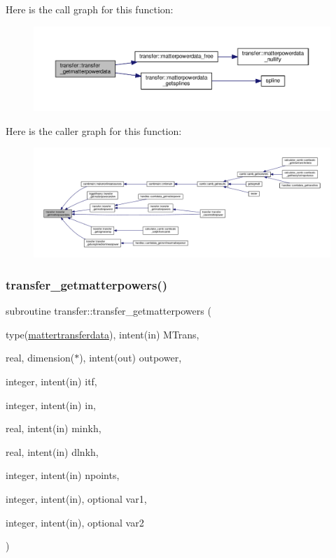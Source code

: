 Here is the call graph for this function\+:
\nopagebreak
\begin{figure}[H]
\begin{center}
\leavevmode
\includegraphics[width=350pt]{namespacetransfer_a149c7870c28cd849591073c3d8f76d69_cgraph}
\end{center}
\end{figure}
Here is the caller graph for this function\+:
\nopagebreak
\begin{figure}[H]
\begin{center}
\leavevmode
\includegraphics[width=350pt]{namespacetransfer_a149c7870c28cd849591073c3d8f76d69_icgraph}
\end{center}
\end{figure}
\mbox{\label{namespacetransfer_a4515b492b259544eae13a774663d6cea}} 
\subsubsection{\texorpdfstring{transfer\+\_\+getmatterpowers()}{transfer\_getmatterpowers()}}
{\footnotesize\ttfamily subroutine transfer\+::transfer\+\_\+getmatterpowers (\begin{DoxyParamCaption}\item[{type(\mbox{\hyperlink{structtransfer_1_1mattertransferdata}{mattertransferdata}}), intent(in)}]{M\+Trans,  }\item[{real, dimension($\ast$), intent(out)}]{outpower,  }\item[{integer, intent(in)}]{itf,  }\item[{integer, intent(in)}]{in,  }\item[{real, intent(in)}]{minkh,  }\item[{real, intent(in)}]{dlnkh,  }\item[{integer, intent(in)}]{npoints,  }\item[{integer, intent(in), optional}]{var1,  }\item[{integer, intent(in), optional}]{var2 }\end{DoxyParamCaption})}



